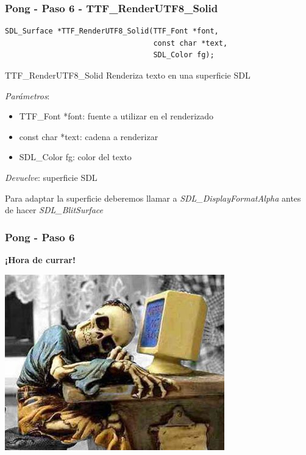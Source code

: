 \begin{frame}[fragile]
    \frametitle{Pong - Paso 6 - TTF\_RenderUTF8\_Solid}
	
\begin{verbatim}
SDL_Surface *TTF_RenderUTF8_Solid(TTF_Font *font,
                                  const char *text,
                                  SDL_Color fg);
\end{verbatim}

    \begin{block}{TTF\_RenderUTF8\_Solid}
	Renderiza texto en una superficie SDL
	
	\emph{Parámetros}:
	\begin{itemize}
	    \item TTF\_Font *font: fuente a utilizar en el renderizado
	    \item const char *text: cadena a renderizar
	    \item SDL\_Color fg: color del texto
	\end{itemize}
	
	\emph{Devuelve}: superficie SDL

    \end{block}
    
    Para adaptar la superficie deberemos llamar a \emph{SDL\_DisplayFormatAlpha}
    antes de hacer \emph{SDL\_BlitSurface}

\end{frame}

\begin{frame}
	\frametitle{Pong - Paso 6}
	
    \begin{center}
        \textbf{¡Hora de currar!}
    \end{center}
	
    \begin{center}
		\includegraphics[scale=0.7]{img/currar-3.jpg}
	\end{center}	

\end{frame}

